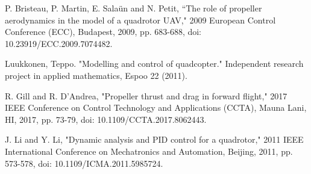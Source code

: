 \begin{thebibliography}{99}
P. Bristeau, P. Martin, E. Salaün and N. Petit, ``The role of propeller aerodynamics in the model of a quadrotor UAV," 2009 European Control Conference (ECC), Budapest, 2009, pp. 683-688, doi: 10.23919/ECC.2009.7074482.

Luukkonen, Teppo. "Modelling and control of quadcopter." Independent research project in applied mathematics, Espoo 22 (2011).


R. Gill and R. D'Andrea, "Propeller thrust and drag in forward flight," 2017 IEEE Conference on Control Technology and Applications (CCTA), Mauna Lani, HI, 2017, pp. 73-79, doi: 10.1109/CCTA.2017.8062443.

J. Li and Y. Li, "Dynamic analysis and PID control for a quadrotor," 2011 IEEE International Conference on Mechatronics and Automation, Beijing, 2011, pp. 573-578, doi: 10.1109/ICMA.2011.5985724.
\end{thebibliography}